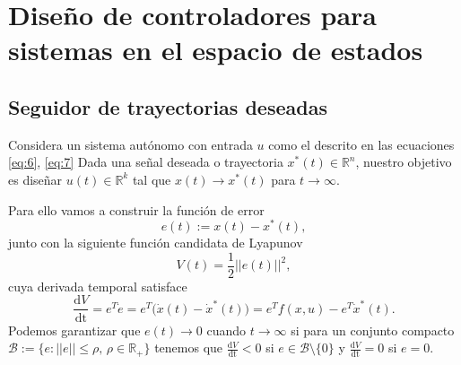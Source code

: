 \chapter[Diseño de controladores para s. en el espacio de estados]{Diseño de controladores para sistemas en el espacio de estados}

\section{Seguidor de trayectorias deseadas}
Considera un sistema autónomo con entrada $u$ como el descrito en las ecuaciones \ref{eq:6}, \ref{eq:7} Dada una señal deseada o trayectoria $x^*(t)\in\mathbb{R}^n$, nuestro objetivo es diseñar $u(t)\in\mathbb{R}^k$ tal que $x(t) \to x^*(t)$ para $t\to\infty$.

Para ello vamos a construir la función de error
\begin{equation}
	e(t) := x(t) - x^*(t),
\end{equation}
junto con la siguiente función candidata de Lyapunov
\begin{equation}
	V(t) = \frac{1}{2}||e(t)||^2,
	\label{eq: lyaE}
\end{equation}
cuya derivada temporal satisface
\begin{equation}
	\frac{\mathrm{d}V}{\mathrm{dt}} = e^T\dot e = e^T\big(\dot x(t) - \dot x^*(t)\big) = e^Tf(x,u) - e^T \dot x^*(t).
\end{equation}
Podemos garantizar que $e(t)\to 0$ cuando $t\to\infty$ si para un conjunto compacto $\mathcal{B} := \{e : ||e|| \leq \rho, \, \rho\in\mathbb{R}_+ \}$ tenemos que $\frac{\mathrm{d}V}{\mathrm{dt}} < 0$ si $e\in\mathcal{B} \setminus \{0\}$ y $\frac{\mathrm{d}V}{\mathrm{dt}} = 0$ si $e = 0$.

